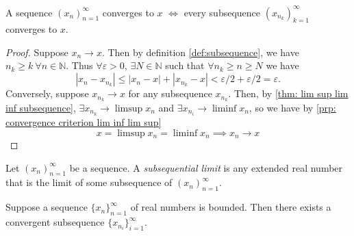\documentclass[../main.tex]{subfiles}
\begin{document}
    
    \begin{exercise}
    A sequence $ (x_n)^\infty_{n=1}$ converges to $x$ $\iff$ every subsequence $ (x_{n_k})^\infty_{k = 1}$ converges to $x$.
    \end{exercise}
    
\begin{proof}
Suppose $x_n \to x$. Then by definition \ref{def:subsequence}, we have
$n_k \geq k \ \forall n \in \mathbb{N}$. Thus $\forall \varepsilon >0$,
$\exists N \in \mathbb{N}$ such that $\forall n_k \geq n \geq N$ we have \[
|x_n - x_{n_k}| \leq |x_n - x| + |x_{n_k} - x| < \varepsilon/2 + \varepsilon/2 = \varepsilon.
\]
Conversely, suppose $x_{n_k} \to x$ for any subsequence $x_{n_k}$. 
Then, by \ref{thm: lim sup lim inf subsequence}, $\exists x_{n_k} \to \limsup{x_n}$ and $\exists x_{n_i} \to \liminf{x_n}$,
so we have by \ref{prp: convergence criterion lim inf lim sup} \[
x = \limsup{x_n} = \liminf{x_n} \implies x_n \to x
\] 
\end{proof}
    
    
    
    \begin{definition}
    Let  $ (x_n)^\infty_{n=1}$ be a sequence. A \textit{subsequential limit} is any extended real number that is the limit of some subsequence of  $ (x_n)^\infty_{n=1}$.
        
    \end{definition}
    
    
    
    
    \begin{theorem} \label{thm: Bolzano-Weierstrass}
    Suppose a sequence \( \{x_n\}_{n=1}^{\infty} \) of real numbers is bounded. Then there exists a convergent subsequence \( \{x_{n_i}\}_{i=1}^{\infty} \).
    \end{theorem}
    
    
    
\end{document}
